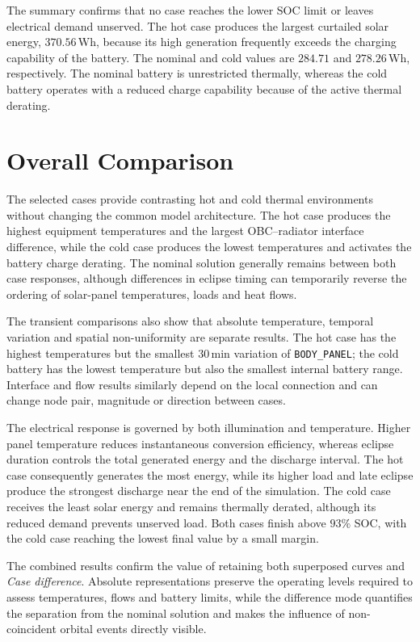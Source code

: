 The summary confirms that no case reaches the lower SOC limit or leaves
electrical demand unserved. The hot case produces the largest curtailed solar
energy, $370.56\,\mathrm{Wh}$, because its high generation frequently exceeds
the charging capability of the battery. The nominal and cold values are
$284.71$ and $278.26\,\mathrm{Wh}$, respectively. The nominal battery is
unrestricted thermally, whereas the cold battery operates with a reduced
charge capability because of the active thermal derating.


\FloatBarrier

\section{Overall Comparison}
\label{sec:overall_comparison}

The selected cases provide contrasting hot and cold thermal environments
without changing the common model architecture. The hot case produces the
highest equipment temperatures and the largest OBC--radiator interface
difference, while the cold case produces the lowest temperatures and activates
the battery charge derating. The nominal solution generally remains between
both case responses, although differences in eclipse timing can temporarily
reverse the ordering of solar-panel temperatures, loads and heat flows.

The transient comparisons also show that absolute temperature, temporal
variation and spatial non-uniformity are separate results. The hot case has the
highest temperatures but the smallest $30\,\mathrm{min}$ variation of
\texttt{BODY\_PANEL}; the cold battery has the lowest temperature but also the
smallest internal battery range. Interface and flow results similarly depend
on the local connection and can change node pair, magnitude or direction
between cases.

The electrical response is governed by both illumination and temperature.
Higher panel temperature reduces instantaneous conversion efficiency, whereas
eclipse duration controls the total generated energy and the discharge
interval. The hot case consequently generates the most energy, while its
higher load and late eclipse produce the strongest discharge near the end of
the simulation. The cold case receives the least solar energy and remains
thermally derated, although its reduced demand prevents unserved load. Both
cases finish above $93\%$ SOC, with the cold case reaching the lowest final
value by a small margin.

The combined results confirm the value of retaining both superposed curves and
\textit{Case difference}. Absolute representations preserve the operating
levels required to assess temperatures, flows and battery limits, while the
difference mode quantifies the separation from the nominal solution and makes
the influence of non-coincident orbital events directly visible.

\FloatBarrier

